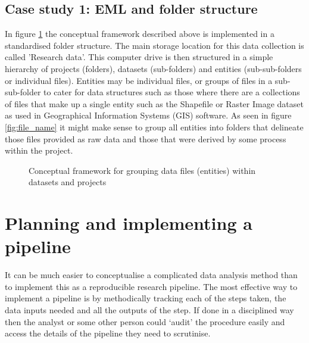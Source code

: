 \documentclass[11pt,a4paper]{article}
\begin{document}
\subsection{Case study 1: EML and folder structure}

In figure \ref{fig:M2} the conceptual framework described above is implemented in a standardised folder structure.  The main storage location for this data collection is called 'Research data'.  
This computer drive is then structured in a simple hierarchy of projects (folders), datasets (sub-folders) and entities (sub-sub-folders or individual files).  Entities may be individual files, or groups of files in a sub-sub-folder to cater for data structures such as those where there are a collections of files that make up a single entity such as the Shapefile or Raster Image dataset as used in Geographical Information Systems (GIS) software.  As seen in figure \ref{fig:file_name} it might make sense to group all entities into folders that delineate those files provided as raw data and those that were derived by some process within the project.

\begin{figure}[!h]
\centering
{}
\caption{Conceptual framework for grouping data files (entities) within datasets and projects} \label{fig:M2}
\end{figure}

\newpage

\section{Planning and implementing a
pipeline}\label{planning-and-implementing-a-pipeline}

It can be much easier to conceptualise a complicated data analysis
method than to implement this as a reproducible research pipeline. The
most effective way to implement a pipeline is by methodically tracking
each of the steps taken, the data inputs needed and all the outputs of
the step. If done in a disciplined way then the analyst or some other
person could `audit' the procedure easily and access the details of the
pipeline they need to scrutinise.
\end{document}
